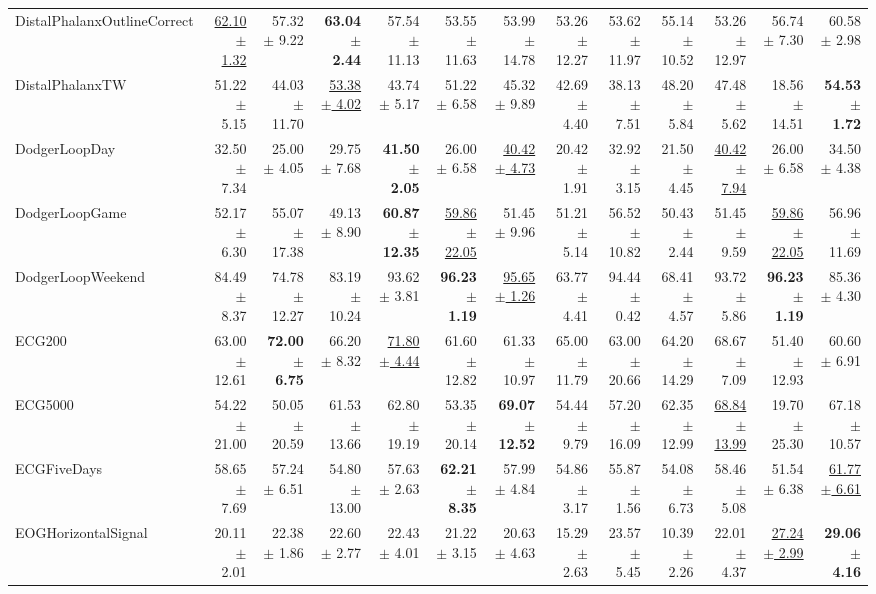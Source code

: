 \begin{landscape}
\begin{longtable}{lrrrrrrrrrrrr}
DistalPhalanxOutlineCorrect & \underline{62.10 $\pm$ 1.32} & 57.32 $\pm$ 9.22 & \textbf{63.04 $\pm$ 2.44} & 57.54 $\pm$ 11.13 & 53.55 $\pm$ 11.63 & 53.99 $\pm$ 14.78 & 53.26 $\pm$ 12.27 & 53.62 $\pm$ 11.97 & 55.14 $\pm$ 10.52 & 53.26 $\pm$ 12.97 & 56.74 $\pm$ 7.30 & 60.58 $\pm$ 2.98 \\
DistalPhalanxTW & 51.22 $\pm$ 5.15 & 44.03 $\pm$ 11.70 & \underline{53.38 $\pm$ 4.02} & 43.74 $\pm$ 5.17 & 51.22 $\pm$ 6.58 & 45.32 $\pm$ 9.89 & 42.69 $\pm$ 4.40 & 38.13 $\pm$ 7.51 & 48.20 $\pm$ 5.84 & 47.48 $\pm$ 5.62 & 18.56 $\pm$ 14.51 & \textbf{54.53 $\pm$ 1.72} \\
DodgerLoopDay & 32.50 $\pm$ 7.34 & 25.00 $\pm$ 4.05 & 29.75 $\pm$ 7.68 & \textbf{41.50 $\pm$ 2.05} & 26.00 $\pm$ 6.58 & \underline{40.42 $\pm$ 4.73} & 20.42 $\pm$ 1.91 & 32.92 $\pm$ 3.15 & 21.50 $\pm$ 4.45 & \underline{40.42 $\pm$ 7.94} & 26.00 $\pm$ 6.58 & 34.50 $\pm$ 4.38 \\
DodgerLoopGame & 52.17 $\pm$ 6.30 & 55.07 $\pm$ 17.38 & 49.13 $\pm$ 8.90 & \textbf{60.87 $\pm$ 12.35} & \underline{59.86 $\pm$ 22.05} & 51.45 $\pm$ 9.96 & 51.21 $\pm$ 5.14 & 56.52 $\pm$ 10.82 & 50.43 $\pm$ 2.44 & 51.45 $\pm$ 9.59 & \underline{59.86 $\pm$ 22.05} & 56.96 $\pm$ 11.69 \\
DodgerLoopWeekend & 84.49 $\pm$ 8.37 & 74.78 $\pm$ 12.27 & 83.19 $\pm$ 10.24 & 93.62 $\pm$ 3.81 & \textbf{96.23 $\pm$ 1.19} & \underline{95.65 $\pm$ 1.26} & 63.77 $\pm$ 4.41 & 94.44 $\pm$ 0.42 & 68.41 $\pm$ 4.57 & 93.72 $\pm$ 5.86 & \textbf{96.23 $\pm$ 1.19} & 85.36 $\pm$ 4.30 \\
ECG200 & 63.00 $\pm$ 12.61 & \textbf{72.00 $\pm$ 6.75} & 66.20 $\pm$ 8.32 & \underline{71.80 $\pm$ 4.44} & 61.60 $\pm$ 12.82 & 61.33 $\pm$ 10.97 & 65.00 $\pm$ 11.79 & 63.00 $\pm$ 20.66 & 64.20 $\pm$ 14.29 & 68.67 $\pm$ 7.09 & 51.40 $\pm$ 12.93 & 60.60 $\pm$ 6.91 \\
ECG5000 & 54.22 $\pm$ 21.00 & 50.05 $\pm$ 20.59 & 61.53 $\pm$ 13.66 & 62.80 $\pm$ 19.19 & 53.35 $\pm$ 20.14 & \textbf{69.07 $\pm$ 12.52} & 54.44 $\pm$ 9.79 & 57.20 $\pm$ 16.09 & 62.35 $\pm$ 12.99 & \underline{68.84 $\pm$ 13.99} & 19.70 $\pm$ 25.30 & 67.18 $\pm$ 10.57 \\
ECGFiveDays & 58.65 $\pm$ 7.69 & 57.24 $\pm$ 6.51 & 54.80 $\pm$ 13.00 & 57.63 $\pm$ 2.63 & \textbf{62.21 $\pm$ 8.35} & 57.99 $\pm$ 4.84 & 54.86 $\pm$ 3.17 & 55.87 $\pm$ 1.56 & 54.08 $\pm$ 6.73 & 58.46 $\pm$ 5.08 & 51.54 $\pm$ 6.38 & \underline{61.77 $\pm$ 6.61} \\
EOGHorizontalSignal & 20.11 $\pm$ 2.01 & 22.38 $\pm$ 1.86 & 22.60 $\pm$ 2.77 & 22.43 $\pm$ 4.01 & 21.22 $\pm$ 3.15 & 20.63 $\pm$ 4.63 & 15.29 $\pm$ 2.63 & 23.57 $\pm$ 5.45 & 10.39 $\pm$ 2.26 & 22.01 $\pm$ 4.37 & \underline{27.24 $\pm$ 2.99} & \textbf{29.06 $\pm$ 4.16} \\

\end{longtable}
\end{landscape}
